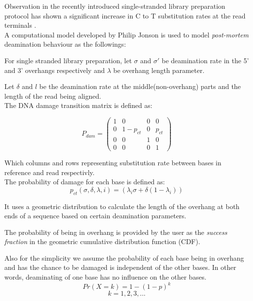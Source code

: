\documentclass[11pt,a4paper]{report}
\begin{document}
Observation in the recently introduced single-stranded library preparation protocol
has shown a significant increase in C to T substitution rates at the read terminals
\cite{mapdamage2}.\\

A computational model developed by Philip Jonson \cite{mapdamage2} is used to model
\emph{post-mortem} deamination behaviour as the followings:

For single stranded library preparation,
let $\sigma$ and $\sigma\prime $ be deamination rate in the 5' and 3' overhangs 
respectively and $\lambda$ be overhang length parameter. 

Let  $\delta$ and $l$ be the deamination rate at the middle(non-overhang) parts 
and the length of the read being aligned.\\

The DNA damage transition matrix is defined as:

$$ P_{dam} = 
 \begin{pmatrix}
  1 & 0 & 0 & 0 \\
  0 & 1-p_{ct} & 0 & p_{ct} \\
  0  & 0  & 1 & 0  \\
  0 & 0 & 0 & 1 
 \end{pmatrix}$$
 
Which columns and rows representing substitution rate between bases in reference 
and read respectivly.\\
The probability of damage for each base is defined as\cite{mapdamage2}:\\
$$ p_{ct}(\sigma, \delta, \lambda, i) = ( \lambda_{i} \sigma + \delta(1 - \lambda_{i})) $$
 
It uses a geometric distribution to calculate the length of the overhang at both 
ends of a sequence based on certain deamination parameters.

The probability of being in overhang is provided by the user as the \emph{success 
fraction} in the geometric cumulative distribution function (CDF).

Also for the simplicity we assume the probability of each base being in overhang 
and has the chance to be damaged is independent of the other bases. In other 
words, deaminating of one base has no influence on the other bases.\\

$$Pr( X=k ) = 1 - (1 - p)^{k}$$
$$ k = 1, 2, 3, ... $$
\end{document}
